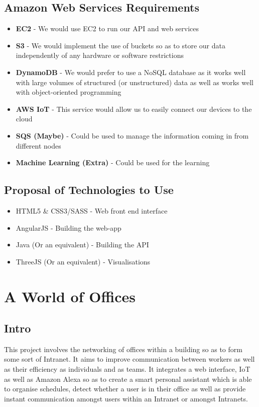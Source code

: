 \documentclass{article}
\begin{document}
	\subsection{Amazon Web Services Requirements}
		\begin{itemize}
			\item \textbf{EC2} - We would use EC2 to run our API and web services
			\item \textbf{S3} - We would implement the use of buckets so as to store our data independently of any hardware or software restrictions
			\item \textbf{DynamoDB} - We would prefer to use a NoSQL database as it works well with large volumes of structured (or unstructured) data as well as works well with object-oriented programming
			\item \textbf{AWS IoT} - This service would allow us to easily connect our devices to the cloud
			\item \textbf{SQS (Maybe)} - Could be used to manage the information coming in from different nodes
			\item \textbf{Machine Learning (Extra)} - Could be used for the learning
		\end{itemize}
	\subsection{Proposal of Technologies to Use}
		\begin{itemize}
			\item HTML5 \& CSS3/SASS - Web front end interface
			\item AngularJS - Building the web-app
			\item Java (Or an equivalent) - Building the API
			\item ThreeJS (Or an equivalent) - Visualisations
		\end{itemize}
		
\cleardoublepage
	\section{A World of Offices}
	\subsection{Intro}
		This project involves the networking of offices within a building so as to form some sort of Intranet. It aims to improve communication between workers as well as their efficiency as individuals and as teams. It integrates a web interface, IoT as well as Amazon Alexa so as to create a smart personal assistant which is able to organise schedules, detect whether a user is in their office as well as provide instant communication amongst users within an Intranet or amongst Intranets.
\end{document}
